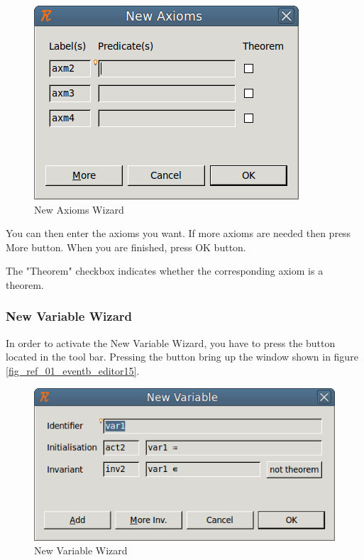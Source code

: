 \begin{figure}[!h]
\begin{center}
	\includegraphics{img/reference/ref_01_eventb_editor7.png}
	\caption{New Axioms Wizard}
	\label{fig_ref_01_eventb_editor7}
\end{center}
\end{figure}

You can then enter the axioms you want. If more axioms are needed then press \textsf{More} button. When you are finished, press \textsf{OK} button.

The "Theorem" checkbox indicates whether the corresponding axiom is a theorem.

\subsubsection{New Variable Wizard}

In order to activate the \textsf{New Variable Wizard}, you have to press the  button located in the tool bar. Pressing the button bring up the window shown in figure \ref{fig_ref_01_eventb_editor15}.

\begin{figure}[!h]
\begin{center}
	\includegraphics{img/reference/ref_01_eventb_editor14.png}
	\caption{New Variable Wizard}
	\label{fig_ref_01_eventb_editor14}
\end{center}
\end{figure}


